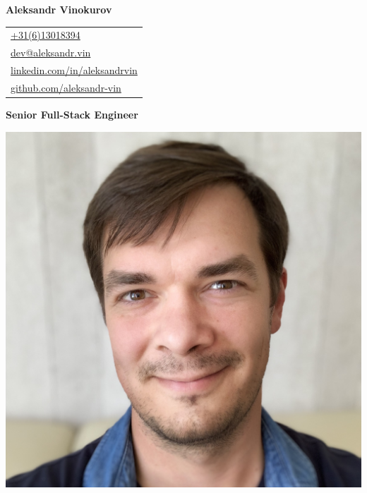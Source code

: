 \documentclass[letterpaper, 11pt]{article}
\begin{document}
\noindent
\begin{minipage}[t]{0.65\textwidth}

  \textbf{\Huge Aleksandr Vinokurov}

  \vspace{1.7em}

  \begin{tabular}{@{\hspace{1.5em}}l}
    \href{tel:+31613018394}{\url{+31(6)13018394}} \\
    \href{mailto:dev@aleksandr.vin}{\url{dev@aleksandr.vin}} \\
    \href{https://linkedin.com/in/aleksandrvin}{\url{linkedin.com/in/aleksandrvin}} \\
    \href{https://github.com/aleksandr-vin}{\url{github.com/aleksandr-vin}} \\
  \end{tabular}

  \vspace{1.6em}

  \noindent\parbox{\linewidth}{\raggedright\textbf{\Large Senior Full-Stack Engineer}}
\end{minipage}\hfill
\begin{minipage}[t]{0.27\textwidth}
  \vspace{-5ex} %
  \includegraphics[width=\linewidth]{me.jpg}
\end{minipage}
\end{document}
